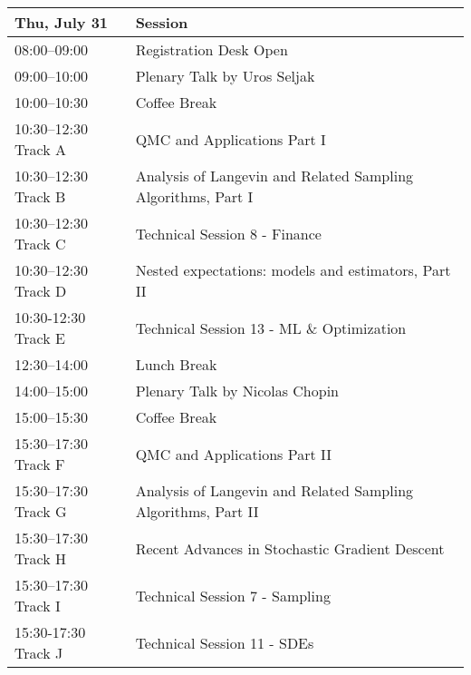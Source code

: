 \begin{table}
\begin{tabularx}{\textwidth}{>{\hsize=0.5\hsize}X|>{\hsize=1.5\hsize}X}
\hline
\textbf{Thu, July 31} & \textbf{Session} \\
\hline
\cellcolor{\EmptyColor}08:00–09:00 & \cellcolor{\EmptyColor}Registration Desk Open \\
\cellcolor{\PlenaryColor}09:00–10:00 & \cellcolor{\PlenaryColor}Plenary Talk by Uros Seljak \\
\cellcolor{\EmptyColor}10:00–10:30 & \cellcolor{\EmptyColor}Coffee Break \\
\cellcolor{\SessionTitleColor}10:30–12:30 Track A & \cellcolor{\SessionTitleColor}QMC and Applications Part I \\
\cellcolor{\SessionTitleColor}10:30–12:30 Track B & \cellcolor{\SessionTitleColor}Analysis of Langevin and Related Sampling Algorithms, Part I \\
\cellcolor{\SessionLightColor}10:30–12:30 Track C & \cellcolor{\SessionLightColor}Technical Session 8 - Finance \\
\cellcolor{\SessionTitleColor}10:30–12:30 Track D & \cellcolor{\SessionTitleColor}Nested expectations: models and estimators, Part II \\
\cellcolor{\SessionLightColor}10:30-12:30 Track E & \cellcolor{\SessionLightColor}Technical Session 13 - ML \& Optimization \\
\cellcolor{\EmptyColor}12:30–14:00 & \cellcolor{\EmptyColor}Lunch Break \\
\cellcolor{\PlenaryColor}14:00–15:00 & \cellcolor{\PlenaryColor}Plenary Talk by Nicolas Chopin \\
\cellcolor{\EmptyColor}15:00–15:30 & \cellcolor{\EmptyColor}Coffee Break \\
\cellcolor{\SessionTitleColor}15:30–17:30 Track F & \cellcolor{\SessionTitleColor}QMC and Applications Part II \\
\cellcolor{\SessionTitleColor}15:30–17:30 Track G & \cellcolor{\SessionTitleColor}Analysis of Langevin and Related Sampling Algorithms, Part II \\
\cellcolor{\SessionTitleColor}15:30–17:30 Track H & \cellcolor{\SessionTitleColor}Recent Advances in Stochastic Gradient Descent \\
\cellcolor{\SessionLightColor}15:30–17:30 Track I & \cellcolor{\SessionLightColor}Technical Session 7 - Sampling \\
\cellcolor{\SessionLightColor}15:30-17:30 Track J & \cellcolor{\SessionLightColor}Technical Session 11 - SDEs \\
\hline
\end{tabularx}
\end{table}

